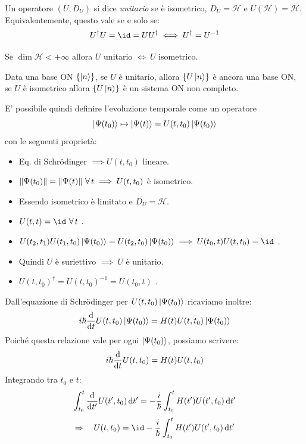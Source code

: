 \begin{definition}
    Un operatore \((U, D_U)\) si dice \textit{unitario} se è isometrico, \(D_U = \mathcal{H}\) e \(U(\mathcal{H})= \mathcal{H}\).
    Equivalentemente, questo vale se e solo se:
    \begin{equation}
        U^\dagger U = \id = UU^\dagger \iff U^\dagger = U^{-1}
    \end{equation}
\end{definition}

\begin{remark}
    Se \(\dim \mathcal{H}< +\infty\) allora \(U\) unitario \(\iff \ U\) isometrico.
\end{remark}

\begin{remark}
    Data una base ON \(\left\{ \ket{n} \right\}\), se \(U\) è unitario, allora \(\left\{ U\ket{n} \right\}\) è ancora una base ON, 
    se \(U\) è isometrico allora \(\left\{ U\ket{n} \right\}\) è un sistema ON non completo.
\end{remark}

E' possibile quindi definire l'evoluzione temporale come un operatore
\begin{equation}
    \ket{\Psi(t_0)}\mapsto \ket{\Psi(t)}= U(t, t_0)\ket{\Psi(t_0)}
\end{equation}
con le seguenti proprietà:
\begin{itemize}
    \item Eq. di Schrödinger \(\implies U(t, t_0)\) lineare.
    \item \(\norm{\Psi(t_0)}= \norm{\Psi(t)} \ \forall\,t \implies U(t,t_0)\) è isometrico.
    \item Essendo isometrico è limitato e \(\overline{D_U}= \mathcal{H}\).
    \item \(U(t,t) = \id \ \forall\,t\) .
    \item \(U(t_2,t_1)U(t_1,t_0)\ket{\Psi(t_0)}= U(t_2,t_0)\ket{\Psi(t_0)} \implies  U (t_0,t)U(t,t_0)= \id\) .
    \item Quindi \(U\) è suriettivo \(\implies \ U \) è unitario.
    \item \( U(t,t_0)^\dagger= U(t,t_0)^{-1}= U(t_0,t)\) .
\end{itemize}

Dall'equazione di Schrödinger per \(U(t,t_0)\ket{\Psi(t_0)}\) ricaviamo inoltre:
\[
i\hbar \dv{t} U(t,t_0)\ket{\Psi(t_0)} = H(t)U(t,t_0)\ket{\Psi(t_0)}
\]
Poiché questa relazione vale per ogni \(\ket{\Psi(t_0)}\), possiamo scrivere:
\[
i\hbar \dv{t} U(t,t_0) = H(t)U(t,t_0)
\]
Integrando tra \(t_0\) e \(t\):
\[
\int_{t_0}^{t} \dv{t'} U(t',t_0)\dd{t'} = -\frac{i}{\hbar}\int_{t_0}^{t} H(t')U(t',t_0)\dd{t'}
\]
\[
\Rightarrow \quad U(t,t_0) = \id - \frac{i}{\hbar}\int_{t_0}^{t} H(t')U(t',t_0)\dd{t'}
\]


